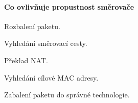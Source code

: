 \paragraph*{Co ovlivňuje propustnost směrovače} \begin{compactitem}
    \item Rozbalení paketu.
    \item Vyhledání směrovací cesty.
    \item Překlad NAT.
    \item Vyhledání cílové MAC adresy.
    \item Zabalení paketu do správné technologie.
\end{compactitem}
